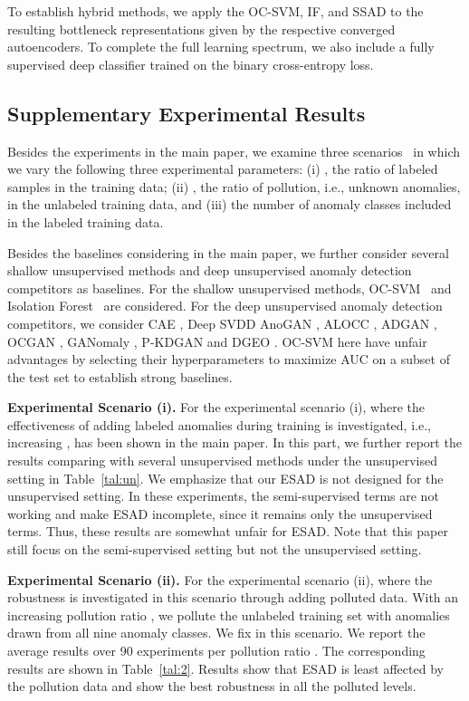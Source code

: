 \documentclass{bmvc2k}
\begin{document}
To establish hybrid methods, we apply the OC-SVM, IF, and SSAD to the resulting bottleneck representations given by the respective converged autoencoders. To complete the full learning spectrum, we also include a fully supervised deep classifier trained on the binary cross-entropy loss.

\subsection{Supplementary Experimental Results}
Besides the experiments in the main paper, we examine three scenarios~\cite{SAD} in which we vary the following three experimental parameters:
(i) , the ratio of labeled samples in the training data; (ii) , the ratio of pollution, i.e., unknown anomalies, in the unlabeled training data, and (iii) the number of anomaly classes  included in the labeled training data. 

Besides the baselines considering in the main paper, we further consider several shallow unsupervised methods and deep unsupervised anomaly detection competitors as baselines. For the shallow unsupervised methods, OC-SVM~\cite{scholkopf2001estimating} and Isolation Forest~\cite{liu2008isolation} are considered. For the deep unsupervised anomaly detection competitors, we consider CAE \cite{masci2011stacked}, Deep SVDD \cite{ruff2018deep} AnoGAN \cite{schlegl2017unsupervised}, ALOCC \cite{Sabokrou2018Adversarially}, ADGAN \cite{deecke2018anomaly}, OCGAN \cite{perera2019ocgan}, GANomaly \cite{akccay2019skip}, P-KDGAN \cite{zhang2020p} and DGEO \cite{golan2018deep}. 
OC-SVM here have unfair advantages by selecting their hyperparameters to maximize AUC on a subset  of the test set to establish strong baselines.

\noindent\textbf{Experimental Scenario (i).} For the experimental scenario (i), where the effectiveness of adding labeled anomalies during training is investigated, i.e., increasing , has been shown in the main paper. In this part, we further report the results comparing with several unsupervised methods under the unsupervised setting in Table~\ref{tal:un}. We emphasize that our ESAD is not designed for the unsupervised setting. In these experiments, the semi-supervised terms are not working and make ESAD incomplete, since it remains only the unsupervised terms. Thus, these results are somewhat unfair for ESAD. Note that this paper still focus on the semi-supervised setting but not the unsupervised setting.

\noindent\textbf{Experimental Scenario (ii).} For the experimental scenario (ii), where the robustness is investigated in this scenario through adding polluted data. With an increasing pollution ratio , we pollute the unlabeled training set with anomalies drawn from all nine anomaly classes. We fix  in this scenario. We report the average results over 90 experiments per pollution ratio . The corresponding results are shown in Table~\ref{tal:2}. Results show that ESAD is least affected by the pollution data and show the best robustness in all the polluted levels.
\end{document}
